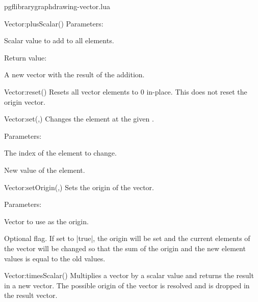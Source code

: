 \begin{filedescription}{pgflibrarygraphdrawing-vector.lua}
\begin{luacommand}{{Vector:plusScalar}()}
Parameters:
\begin{parameterdescription}
	\item[\meta{scalar}] Scalar value to add to all elements. 
\end{parameterdescription}


Return value:
\begin{parameterdescription} 
  \item[] A new vector with the result of the addition. 
\end{parameterdescription}


\end{luacommand}
\begin{luacommand}{{Vector:reset}()}
Resets all vector elements to 0 in-place.  This does not reset the origin vector. 



\end{luacommand}
\begin{luacommand}{{Vector:set}(,)}
Changes the element at the given . 

Parameters:
\begin{parameterdescription}
	\item[\meta{index}] The index of the element to change.\item[\meta{value}] New value of the element. 
\end{parameterdescription}



\end{luacommand}
\begin{luacommand}{{Vector:setOrigin}(,)}
Sets the origin of the vector. 

Parameters:
\begin{parameterdescription}
	\item[\meta{origin}] Vector to use as the origin.\item[\meta{preserve\_values}] Optional flag. If set to |true|, the origin will be set and the current elements of the vector will be changed so that the sum of the origin and the new element values is equal to the old values. 
\end{parameterdescription}



\end{luacommand}
\begin{luacommand}{{Vector:timesScalar}()}
Multiplies a vector by a scalar value and returns the result in a new vector.  The possible origin of the vector is resolved and is dropped in the result vector. 


\end{luacommand}
\end{filedescription}
